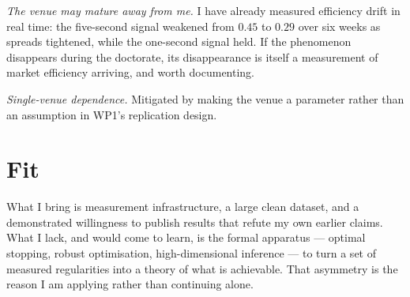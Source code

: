 \documentclass[11pt,a4paper]{article}
\begin{document}
\emph{The venue may mature away from me.} I have already measured efficiency drift in real time: the
five-second signal weakened from $0.45$ to $0.29$ over six weeks as spreads tightened, while the
one-second signal held. If the phenomenon disappears during the doctorate, its disappearance is
itself a measurement of market efficiency arriving, and worth documenting.

\emph{Single-venue dependence.} Mitigated by making the venue a parameter rather than an assumption
in WP1's replication design.

\section{Fit}


What I bring is measurement infrastructure, a large clean dataset, and a demonstrated willingness to
publish results that refute my own earlier claims. What I lack, and would come to learn, is the
formal apparatus --- optimal stopping, robust optimisation, high-dimensional inference --- to turn a
set of measured regularities into a theory of what is achievable. That asymmetry is the reason I am
applying rather than continuing alone.
\end{document}

